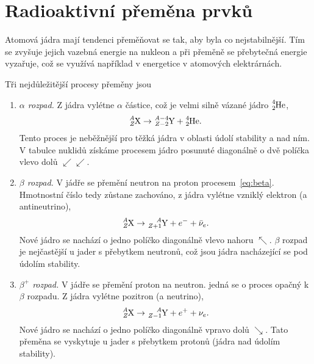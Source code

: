 \documentclass[a4paper,12pt,oneside]{article}
\theoremstyle{red}
\begin{document}
\section{Radioaktivní přeměna prvků}
    Atomová jádra mají tendenci přeměňovat se tak, aby byla co nejstabilnější. Tím se zvyšuje jejich vazebná energie na nukleon a při přeměně se přebytečná energie vyzařuje, což se využívá například v energetice v atomových elektrárnách.

    Tři nejdůležitější procesy přeměny jsou
    \begin{enumerate}
        \item\emph{$\alpha$ rozpad.}
            Z jádra vylétne $\alpha$ částice, což je velmi silně vázané jádro $\ce{^{4}_{2}He}$,
            \begin{equation}
                \ce{^{\it A}_{\it Z}X}\rightarrow\ce{^{{\it A}-4}_{{\it Z}-2}Y}+\ce{^{4}_{2}He}.
            \end{equation}
            Tento proces je neběžnější pro těžká jádra v oblasti údolí stability a nad ním.
            V tabulce nuklidů získáme procesem jádro posunuté diagonálně o dvě políčka vlevo dolů $\swarrow\swarrow$.

        \item\emph{$\beta$ rozpad.}
            V jádře se přemění neutron na proton procesem~\eqref{eq:beta}.
            Hmotnostní číslo tedy zůstane zachováno, z jádra vylétne vzniklý elektron (a antineutrino),
            \begin{equation}
                \ce{^{\it A}_{\it Z}X}\rightarrow\ce{^{\it A}_{{\it Z}+1}Y}+e^{-}+\bar{\nu}_{e}.
            \end{equation}
            Nové jádro se nachází o jedno políčko diagonálně vlevo nahoru $\nwarrow$.
            $\beta$ rozpad je nejčastější u jader s přebytkem neutronů, což jsou jádra nacházející se pod údolím stability.
        
        \item\emph{$\beta^{+}$ rozpad.}
            V jádře se přemění proton na neutron.
            jedná se o proces opačný k $\beta$ rozpadu.
            Z jádra vylétne pozitron (a neutrino),
            \begin{equation}
                \ce{^{\it A}_{\it Z}X}\rightarrow\ce{^{\it A}_{{\it Z}-1}Y}+e^{+}+\nu_{e}.                    
            \end{equation}
            Nové jádro se nachází o jedno políčko diagonálně vpravo dolů $\searrow$.
            Tato přeměna se vyskytuje u jader s přebytkem protonů (jádra nad údolím stability).
    \end{enumerate}
\end{document}
